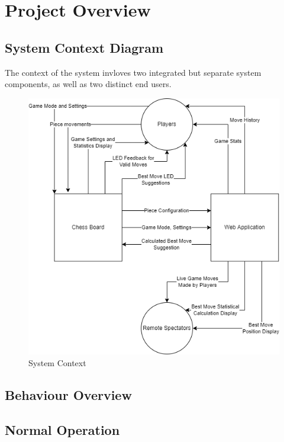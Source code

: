 \documentclass[12pt]{article}
\begin{document}
\section{Project Overview}
\subsection{System Context Diagram}{

    The context of the system invloves two integrated but separate system components, as well as two distinct end users.

    \begin{figure}[H]
    \centering
        \includegraphics[scale=0.65]{chess-connect-system-context.png}
        \caption{System Context}
        \label{Fig_SystemContext} 
    \end{figure}
}

\subsection{Behaviour Overview}{

}

\subsection{Normal Operation}
\end{document}
